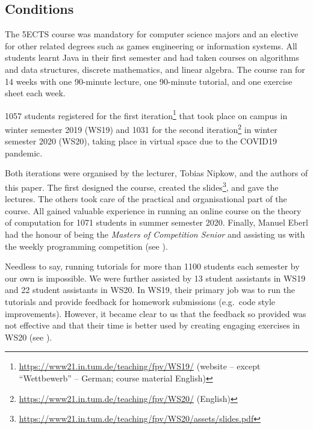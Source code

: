 \subsection{Conditions}

The 5ECTS course was mandatory for computer science majors and
an elective for other related degrees such as games engineering or information systems.
All students learnt Java in their first semester and had taken courses on algorithms and data structures,
discrete mathematics, and linear algebra.
The course ran for 14 weeks with
one 90-minute lecture,
one 90-minute tutorial,
and one exercise sheet each week.

1057 students registered for
the first iteration\footnote{\url{https://www21.in.tum.de/teaching/fpv/WS19/} (website -- except ``Wettbewerb'' -- German; course material English)} that took place on campus in winter semester 2019 (WS19) and
1031 for the second iteration\footnote{\url{https://www21.in.tum.de/teaching/fpv/WS20/} (English)} in winter semester 2020 (WS20), taking place in virtual space due to the COVID19 pandemic.

Both iterations were organised by the lecturer, Tobias Nipkow, and the authors of this paper.
The first designed the course, created the slides\footnote{\url{https://www21.in.tum.de/teaching/fpv/WS20/assets/slides.pdf}}, and gave the lectures.
The others took care of the practical and organisational part of the course.
All gained valuable experience in running an online course on the theory of computation for 1071
students in summer semester 2020.
Finally, Manuel Eberl had the honour of being the \emph{Masters of Competition Senior} and assisting us with the weekly programming competition (see ).

Needless to say,
running tutorials for more than 1100
students each semester by our own is impossible.
We were further assisted by
13 student assistants in WS19 and
22 student assistants in WS20.
In WS19, their primary job was to run the tutorials and provide feedback for homework submissions (e.g.\ code style improvements).
However, it became clear to us
that the feedback so provided was not effective
and that their time is better used by creating engaging exercises in WS20 (see ).



